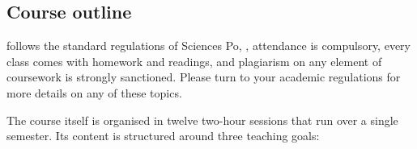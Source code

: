 

%
\subsection{Course outline}%

 follows the standard regulations of Sciences Po, \ie, attendance is compulsory, every class comes with homework and readings, and plagiarism on any element of coursework is strongly sanctioned. Please turn to your academic regulations for more details on any of these topics.%

The course itself is organised in twelve two-hour sessions that run over a single semester. Its content is structured around three teaching goals:%

